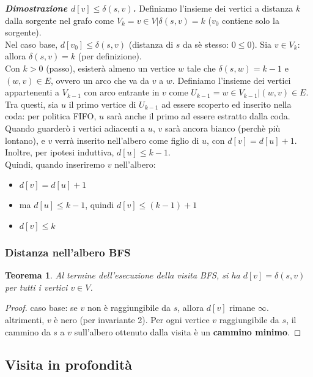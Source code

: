 \documentclass[11pt]{article}
\newtheorem*{theorem}{Teorema}
\theoremstyle{proprietà}
\begin{document}
\textit{\textbf{Dimostrazione $d[v] \leq \delta(s,v)$.}} Definiamo l'insieme dei vertici a distanza $k$ dalla sorgente nel grafo 
come $V_k={v\in V|\delta(s,v)=k}$ ($v_0$ contiene solo la sorgente).\\ Nel caso base, $d[v_0]\leq \delta(s,v)$ (distanza di 
$s$ da sè stesso: $0\leq 0$). Sia $v\in V_k$: allora $\delta(s,v)=k$ (per definizione).\\ Con $k>0$ (passo), esisterà almeno 
un vertice $w$ tale che $\delta(s,w)=k-1$ e $(w,v)\in E$, ovvero un arco che va da $v$ a $w$. Definiamo l'insieme dei vertici 
appartenenti a $V_{k-1}$ con arco entrante in $v$ come $U_{k-1}={w\in V_{k-1}|(w,v)\in E}$. Tra questi, sia $u$ il primo 
vertice di $U_{k-1}$ ad essere scoperto ed inserito nella coda: per politica FIFO, $u$ sarà anche il primo ad essere estratto
dalla coda. Quando guarderò i vertici adiacenti a $u$, $v$ sarà ancora bianco (perchè più lontano), e $v$ verrà inserito 
nell'albero come figlio di $u$, con $d[v]=d[u]+1$. Inoltre, per ipotesi induttiva, $d[u]\leq k-1$.\\
Quindi, quando inseriremo $v$ nell'albero:
\begin{itemize}
    \item $d[v]=d[u]+1$
    \item ma $d[u]\leq k-1$, quindi $d[v]\leq (k-1)+1$
    \item $d[v]\leq k$
\end{itemize}
\subsubsection{Distanza nell'albero BFS}
\begin{theorem}
    Al termine dell'esecuzione della visita BFS, si ha $d[v]=\delta(s,v)$ per tutti i vertici $v\in V$.
\end{theorem}
\begin{proof}
    caso base: se $v$ non è raggiungibile da $s$, allora $d[v]$ rimane $\infty$.\\
    altrimenti, $v$ è nero (per invariante 2). Per ogni vertice $v$ raggiungibile da $s$, il cammino da $s$ a $v$ sull'albero 
    ottenuto dalla visita è un \textbf{cammino minimo}.
\end{proof}
\subsection{Visita in profondità}
\end{document}
